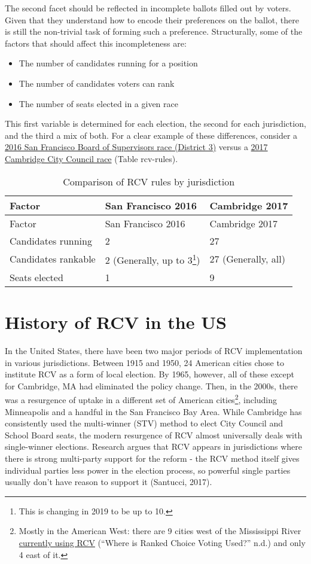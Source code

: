 \documentclass[12pt,twoside]{reedthesis}
\begin{document}
The second facet should be reflected in incomplete ballots filled out by voters. Given that they understand how to encode their preferences on the ballot, there is still the non-trivial task of forming such a preference. Structurally, some of the factors that should affect this incompleteness are:
\begin{itemize}
\item
  The number of candidates running for a position
\item
  The number of candidates voters can rank
\item
  The number of seats elected in a given race
\end{itemize}
This first variable is determined for each election, the second for each jurisdiction, and the third a mix of both. For a clear example of these differences, consider a \href{https://sfelections.org/results/20161108/data/20161206/d3/20161206_d3.pdf}{2016 San Francisco Board of Supervisors race (District 3)} versus a \href{https://www.cambridgema.gov/election2017/Council\%20Order\%20Round.htm}{2017 Cambridge City Council race} (Table rcv-rules).
\begin{longtable}[]{@{}lll@{}}
\caption{\label{tab:rcv-rules} Comparison of RCV rules by jurisdiction}\tabularnewline
\toprule
Factor & San Francisco 2016 & Cambridge 2017\tabularnewline
\midrule
\endfirsthead
\toprule
Factor & San Francisco 2016 & Cambridge 2017\tabularnewline
\midrule
\endhead
Candidates running & 2 & 27\tabularnewline
Candidates rankable & 2 (Generally, up to 3\footnote{This is changing in 2019 to be up to 10.}) & 27 (Generally, all)\tabularnewline
Seats elected & 1 & 9\tabularnewline
\bottomrule
\end{longtable}
\hypertarget{history-of-rcv-in-the-us}{%
\section{History of RCV in the US}\label{history-of-rcv-in-the-us}}

In the United States, there have been two major periods of RCV implementation in various jurisdictions. Between 1915 and 1950, 24 American cities chose to institute RCV as a form of local election. By 1965, however, all of these except for Cambridge, MA had eliminated the policy change. Then, in the 2000s, there was a resurgence of uptake in a different set of American cities\footnote{Mostly in the American West: there are 9 cities west of the Mississippi River \href{https://www.fairvote.org/where_is_ranked_choice_voting_used}{currently using RCV} (``Where is Ranked Choice Voting Used?'' n.d.) and only 4 east of it.}, including Minneapolis and a handful in the San Francisco Bay Area. While Cambridge has consistently used the multi-winner (STV) method to elect City Council and School Board seats, the modern resurgence of RCV almost universally deals with single-winner elections. Research argues that RCV appears in jurisdictions where there is strong multi-party support for the reform - the RCV method itself gives individual parties less power in the election process, so powerful single parties usually don't have reason to support it (Santucci, 2017).
\end{document}
